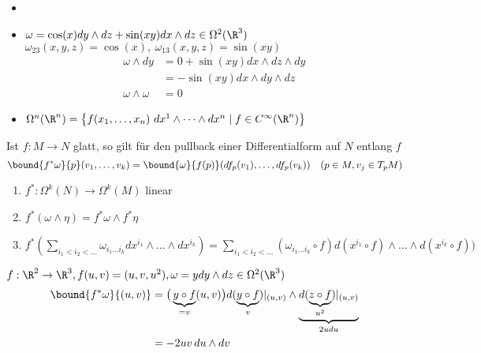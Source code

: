 \begin{exmp*}
	\begin{itemize}
		\item[]
		\item $ \omega = \cos(x) dy \wedge dz + \sin(xy) dx \wedge dz \in \Omega^2(\R^3) $\\
			$ \omega_{23}(x,y,z) = \cos(x),\ \omega_{13}(x,y,z) = \sin(xy) $
			\begin{align*}
				\omega \wedge dy &= 0 +\sin(xy) dx \wedge dz \wedge dy\\
				&= -\sin(xy) dx \wedge dy \wedge dz\\
				\omega \wedge \omega &= 0
			\end{align*}
		
		\item $ \Omega^n(\R^n) = \big\{ f(x_1,\dotsc,x_n)\ dx^1 \wedge \dots \wedge dx^n \mid f \in C^\infty (\R^n) \big\} $
	\end{itemize}
\end{exmp*}

\begin{lem}
	Ist $ f: M \to N $ glatt, so gilt für den pullback einer Differentialform auf $N$ entlang $f$
	\[ \bound{f^*\omega}{p} (v_1,\dotsc,v_k) = \bound{\omega}{f(p)} (df_p(v_1),\dots, df_p(v_k)) \quad (p \in M, v_j \in T_pM) \]
	\begin{enumerate}[label={\roman*})]
		\item $ f^*: \Omega^k(N) \to \Omega^k(M) $ linear
		\item $ f^*(\omega \wedge \eta) = f^*\omega \wedge f^*\eta $
		\item $ f^*\left(\sum\limits_{i_1 < i_2<\dots} \omega_{i_1\dots i_k} dx^{i_1} \wedge \dots \wedge dx^{i_k}\right) = \sum\limits_{i_1<i_2<\dots} ( \omega_{i_1\dots i_k} \circ f) d(x^{i_1} \circ f) \wedge \dots \wedge d(x^{i_k} \circ f) ) $
	\end{enumerate}
\end{lem}

\begin{exmp*}
	$ f: \R^2 \to \R^3, f(u,v) = (u,v,u^2), \omega = y dy \wedge dz \in \Omega^2(\R^3) $
	\begin{align*}
		\bound{f^*\omega}{(u,v)} &= \big(\underbrace{y \circ f}_{=v}(u,v) \big) d(\underbrace{y \circ f}_{v} )|_{(u,v)} \wedge \underbrace{d(\underbrace{z \circ f}_{u^2})|_{(u,v)}}_{2udu}\\
		&= -2uv\, du \wedge dv
	\end{align*}
\end{exmp*}

